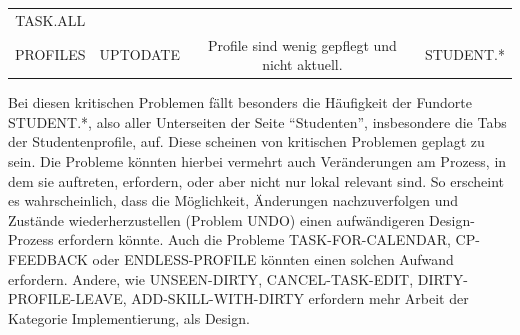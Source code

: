 \documentclass[
  12pt,
  ngerman,
  a4paper,
]{article}
\begin{document}
\begin{longtable}[]{@{}cccc@{}}
\begin{minipage}[t]{0.32\columnwidth}
TASK.ALL\strut
\end{minipage}\tabularnewline
\begin{minipage}[t]{0.11\columnwidth}\centering
PROFILES\strut
\end{minipage} & \begin{minipage}[t]{0.13\columnwidth}\centering
UPTODATE\strut
\end{minipage} & \begin{minipage}[t]{0.33\columnwidth}\centering
Profile sind wenig gepflegt und nicht aktuell.\strut
\end{minipage} & \begin{minipage}[t]{0.32\columnwidth}\centering
STUDENT.*\strut
\end{minipage}\tabularnewline
\bottomrule
\end{longtable}

Bei diesen kritischen Problemen fällt besonders die Häufigkeit der
Fundorte STUDENT.*, also aller Unterseiten der Seite ``Studenten'',
insbesondere die Tabs der Studentenprofile, auf. Diese scheinen von
kritischen Problemen geplagt zu sein. Die Probleme könnten hierbei
vermehrt auch Veränderungen am Prozess, in dem sie auftreten, erfordern,
oder aber nicht nur lokal relevant sind. So erscheint es wahrscheinlich,
dass die Möglichkeit, Änderungen nachzuverfolgen und Zustände
wiederherzustellen (Problem UNDO) einen aufwändigeren Design-Prozess
erfordern könnte. Auch die Probleme TASK-FOR-CALENDAR, CP-FEEDBACK oder
ENDLESS-PROFILE könnten einen solchen Aufwand erfordern. Andere, wie
UNSEEN-DIRTY, CANCEL-TASK-EDIT, DIRTY-PROFILE-LEAVE,
ADD-SKILL-WITH-DIRTY erfordern mehr Arbeit der Kategorie
Implementierung, als Design.
\end{document}
